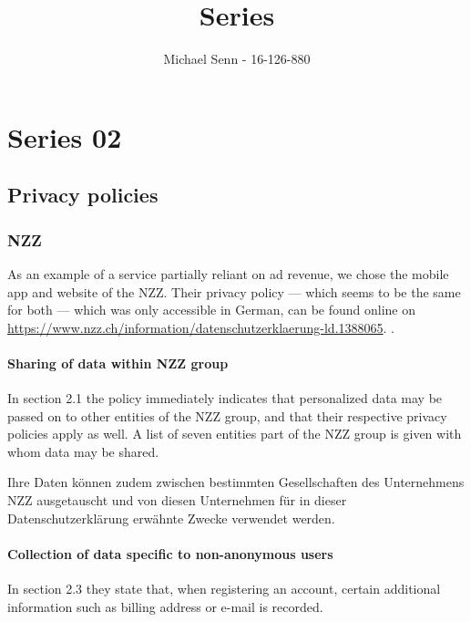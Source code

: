 \documentclass[a4paper]{scrreprt}
\title{Series \series}
\author{Michael Senn \maillink{michael.senn@students.unibe.ch} - 16-126-880}
\date{\printdate}
\newcommand{\series}{02}
\begin{document}
\maketitle


\setcounter{chapter}{\numexpr \series - 1 \relax}

\chapter{Series \series}

\section{Privacy policies}

\subsection{NZZ}

As an example of a service partially reliant on ad revenue, we chose the mobile
app and website of the NZZ. Their privacy policy --- which seems to be the same
for both --- which was only accessible in German, can be found online on
\url{https://www.nzz.ch/information/datenschutzerklaerung-ld.1388065}.
\autocite{nzzgeneralsekretariat/datenschutzverantwortlicherNZZDatenschutzerklaerung}.

\subsubsection{Sharing of data within NZZ group}

In section 2.1 the policy immediately indicates that personalized data may be
passed on to other entities of the NZZ group, and that their respective privacy
policies apply as well. A list of seven entities part of the NZZ group is given
with whom data may be shared.

\begin{displayquote}
		Ihre Daten können zudem zwischen bestimmten Gesellschaften des
		Unternehmens NZZ ausgetauscht und von diesen Unternehmen für in dieser
		Datenschutzerklärung erwähnte Zwecke verwendet werden.
\end{displayquote}

\subsubsection{Collection of data specific to non-anonymous users}

In section 2.3 they state that, when registering an account, certain additional
information such as billing address or e-mail is recorded.
\end{document}
